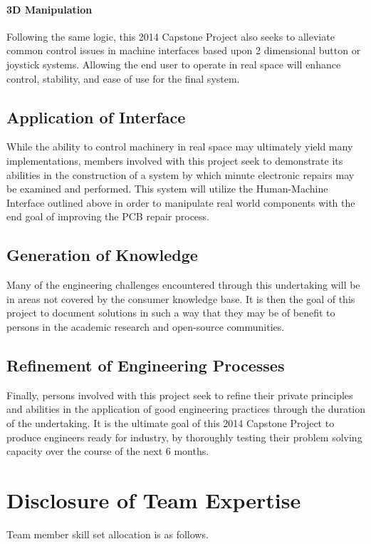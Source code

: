 \documentclass[11pt]{report}
\begin{document}
\paragraph{3D Manipulation}
Following the same logic, this 2014 Capstone Project also seeks to alleviate common control issues in machine interfaces based upon 2 dimensional button or joystick systems.
Allowing the end user to operate in real space will enhance control, stability, and ease of use for the final system.

\subsection{Application of Interface}
While the ability to control machinery in real space may ultimately yield many implementations, members involved with this project seek to demonstrate its abilities in the construction of a system by which minute electronic repairs may be examined and performed.
This system will utilize the Human-Machine Interface outlined above in order to manipulate real world components with the end goal of improving the PCB repair process.

\subsection{Generation of Knowledge}
Many of the engineering challenges encountered through this undertaking will be in areas not covered by the consumer knowledge base.
It is then the goal of this project to document solutions in such a way that they may be of benefit to persons in the academic research and open-source communities.

\subsection{Refinement of Engineering Processes}
Finally, persons involved with this project seek to refine their private principles and abilities in the application of good engineering practices through the duration of the undertaking.
It is the ultimate goal of this 2014 Capstone Project to produce engineers ready for industry, by thoroughly testing their problem solving capacity over the course of the next 6 months.

\section{Disclosure of Team Expertise}
Team member skill set allocation is as follows.
\end{document}
